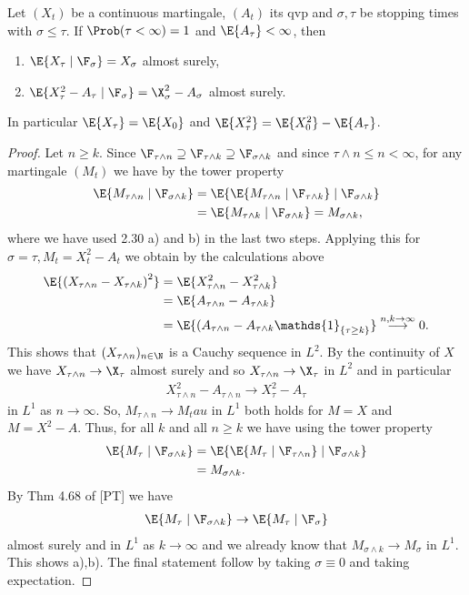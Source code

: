 \begin{thm}
Let $(X_t)$ be a continuous martingale, $(A_t)$ its qvp and $\sigma,\tau$ be stopping times with $\sigma\leq \tau$.
If $\Prob(\tau<\infty)=1$ and $\E{A_\tau}<\infty$, then
\begin{enumerate}[label=\alph*)]
\item $\E{X_\tau \mid \F_\sigma}=X_\sigma$ almost surely,
\item $\E{X_\tau^2-A_\tau \mid \F_\sigma}=\X_\sigma^2-A_\sigma$ almost surely.
\end{enumerate}
In particular $\E{X_\tau}=\E{X_0}$ and $\E{X_\tau^2}=\E{X_0^2}-\E{A_\tau}$.
\end{thm}
\begin{proof}
Let $n\geq k$. Since $\F_{\tau \wedge n}\supseteq \F_{\tau \wedge k} \supseteq \F_{\sigma \wedge k}$ and since $\tau \wedge n \leq n <\infty$, for any martingale $(M_t)$ we have by the tower property
\begin{align*}
\E{M_{\tau \wedge n} \mid \F_{\sigma \wedge k}}&=\E{\E{M_{\tau\wedge n} \mid \F_{\tau \wedge k}} \mid \F_{\sigma \wedge k}}\\
&=\E{M_{\tau \wedge k} \mid \F_{\sigma\wedge k}}=M_{\sigma \wedge k},
\end{align*}
where we have used 2.30 a) and  b) in the last two steps.
Applying this for $\sigma = \tau, M_t=X_t^2-A_t$ we obtain by the calculations above
\begin{align*}
\E{\left(X_{\tau \wedge n}-X_{\tau \wedge k}\right)^2}&=\E{X_{\tau\wedge n}^2 -X_{\tau \wedge k}^2}\\
&=\E{A_{\tau \wedge n}- A_{\tau \wedge k}}\\
&=\E{(A_{\tau \wedge n}- A_{\tau\wedge k} \mathds{1}_{\{\tau \geq k\}}} \overset{n,k \to \infty}{\longrightarrow} 0.
\end{align*}
This shows that $(X_{\tau \wedge n})_{n \in \N}$ is a Cauchy sequence in $\mathit{L}^2$.
By the continuity of $X$ we have $X_{\tau \wedge n} \to \X_{\tau}$ almost surely and so $X_{\tau \wedge n} \to \X_\tau$ in $\mathit{L}^2$ and in particular
\begin{align*}
X_{\tau \wedge n}^2- A_{\tau \wedge n} \to X_\tau^2 -A_\tau
\end{align*}
in $\mathit{L}^1$ as $n \to \infty$.
So, $M_{\tau \wedge n} \to M_tau$ in $\mathit{L}^1$ both holds for $M=X$ and $M=X^2-A$.
Thus, for all $k$ and all $n\geq k$ we have using the tower property
\begin{align*}
\E{M_\tau\mid \F_{\sigma \wedge k}}&=\E{\E{M_\tau \mid \F_{\tau \wedge n}} \mid \F_{\sigma\wedge k}}\\
&=M_{\sigma\wedge k}.
\end{align*}
By Thm 4.68 of [PT] we have
\begin{align*}
\E{M_\tau\mid \F_{\sigma \wedge k}} \to \E{M_\tau \mid \F_\sigma}
\end{align*}
almost surely and in $\mathit{L}^1$ as $k\to \infty$ and we already know that
$M_{\sigma \wedge k} \to M_\sigma$ in $\mathit{L}^1$.
This shows a),b). The final statement follow by taking $\sigma \equiv 0$ and taking expectation. 
\end{proof}


